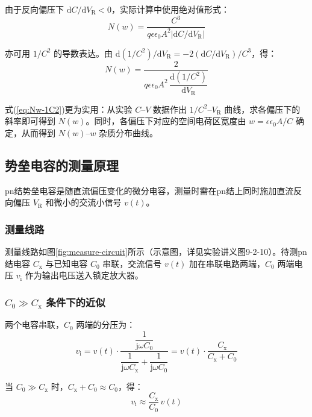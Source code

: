 由于反向偏压下 $\mathrm{d}C/\mathrm{d}V_{\mathrm{R}} < 0$，实际计算中使用绝对值形式：
\begin{equation}\label{eq:Nw-C-abs}
N(w) = \frac{C^{3}}{q\epsilon\epsilon_0 A^{2}\left|\mathrm{d}C/\mathrm{d}V_{\mathrm{R}}\right|}
\end{equation}

亦可用 $1/C^{2}$ 的导数表达。由 $\mathrm{d}(1/C^{2})/\mathrm{d}V_{\mathrm{R}} = -2(\mathrm{d}C/\mathrm{d}V_{\mathrm{R}})/C^{3}$，得：
\begin{equation}\label{eq:Nw-1C2}
N(w) = \frac{2}{q\epsilon\epsilon_0 A^{2}\,\dfrac{\mathrm{d}(1/C^{2})}{\mathrm{d}V_{\mathrm{R}}}}
\end{equation}

式(\ref{eq:Nw-1C2})更为实用：从实验 $C$--$V$ 数据作出 $1/C^{2}$--$V_{\mathrm{R}}$ 曲线，求各偏压下的斜率即可得到 $N(w)$。同时，各偏压下对应的空间电荷区宽度由 $w = \epsilon\epsilon_0 A/C$ 确定，从而得到 $N(w)$--$w$ 杂质分布曲线。


\subsection{势垒电容的测量原理}

pn结势垒电容是随直流偏压变化的微分电容，测量时需在pn结上同时施加直流反向偏压 $V_{\mathrm{R}}$ 和微小的交流小信号 $v(t)$。

\subsubsection{测量线路}

测量线路如图\ref{fig:measure-circuit}所示（示意图，详见实验讲义图9-2-10）。待测pn结电容 $C_{\mathrm{x}}$ 与已知电容 $C_{0}$ 串联，交流信号 $v(t)$ 加在串联电路两端，$C_{0}$ 两端电压 $v_{\mathrm{i}}$ 作为输出电压送入锁定放大器。

\subsubsection{$C_{0} \gg C_{\mathrm{x}}$ 条件下的近似}

两个电容串联，$C_{0}$ 两端的分压为：
\begin{equation}
v_{\mathrm{i}} = v(t) \cdot \frac{\dfrac{1}{\mathrm{j}\omega C_{0}}}{\dfrac{1}{\mathrm{j}\omega C_{\mathrm{x}}} + \dfrac{1}{\mathrm{j}\omega C_{0}}}
= v(t) \cdot \frac{C_{\mathrm{x}}}{C_{\mathrm{x}} + C_{0}}
\end{equation}

当 $C_{0} \gg C_{\mathrm{x}}$ 时，$C_{\mathrm{x}} + C_{0} \approx C_{0}$，得：
\begin{equation}\label{eq:meas-principle}
v_{\mathrm{i}} \approx \frac{C_{\mathrm{x}}}{C_{0}}\,v(t)
\end{equation}

